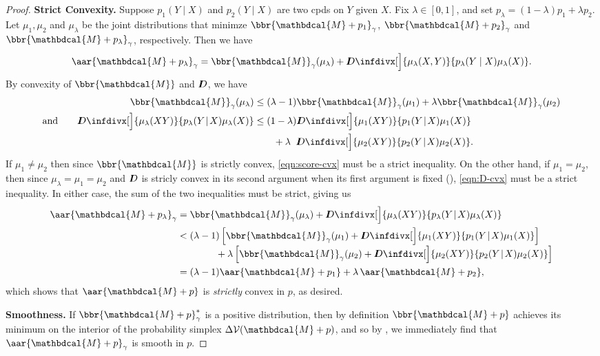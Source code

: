 \documentclass{article}
\theoremstyle{plain}
\newcounter{proofcntr}
\newenvironment{lproof}{\begin{proof}\refstepcounter{proofcntr}}{\end{proof}}
\theoremstyle{definition}
\theoremstyle{remark}
\newcommand{\thickD}{I\mkern-8muD}
\newcommand{\kldiv}{\thickD\infdivx}
\newcommand{\V}{\mathcal V}
\newcommand{\dg}[1]{\mathbdcal{#1}}
\newcommand\smid{\!\mid\!}
\newcommand{\bundle}{\mathbin{+}}
\begin{document}
\begin{lproof}
	\textbf{Strict Convexity.}
	Suppose $p_1(Y \mid X)$ and $p_2(Y\mid X)$ are two cpds on $Y$ given $X$.
	Fix $\lambda \in [0,1]$, and set $p_\lambda = (1-\lambda) p_1 + \lambda p_2$.
	Let $\mu_1, \mu_2$ and $\mu_\lambda$ be the joint distributions that minimze $\bbr{\dg M \bundle p_1}_\gamma$, $\bbr{\dg M \bundle p_2}_\gamma$ and $\bbr{\dg M \bundle p_\lambda}_\gamma$, respectively.  Then we have
	\begin{equation*}
		\aar{\dg M \bundle p_\lambda}_\gamma
			= \bbr{\dg M}_\gamma(\mu_\lambda) + \kldiv[\Big]{\mu_\lambda(X,Y)}{p_\lambda(Y\mid X) \mu_\lambda( X)}.
	\end{equation*}
	By convexity of $\bbr{\dg M}$ and $\thickD$, we have
	\begin{align}
		\bbr{\dg M}_\gamma(\mu_\lambda)
		 	&\le (\lambda-1)\bbr{\dg M}_\gamma(\mu_1) + \lambda \bbr{\dg M}_\gamma(\mu_2)
			 	\label{eqn:score-cvx}\\
		\text{and}\qquad \kldiv[\Big]{\mu_\lambda(XY)}{p_\lambda(Y\smid X) \mu_\lambda( X)}
			&\le (1-\lambda)\kldiv[\Big]{\mu_1(XY)}{p_1(Y \smid X) \mu_1( X)} \nonumber \\
			&\qquad+ \lambda\;\;\kldiv[\Big]{\mu_2(XY)}{p_2(Y\smid X) \mu_2( X)}.
				\label{eqn:D-cvx}
	\end{align}
	If $\mu_1 \ne \mu_2$ then since $\bbr{\dg M}$ is strictly convex, \eqref{eqn:score-cvx} must
	be a strict inequality. On the other hand, if $\mu_1 = \mu_2$, then since $\mu_\lambda = \mu_1 = \mu_2$ and $\thickD$ is stricly convex in its second argument when its first argument is fixed (), \eqref{eqn:D-cvx} must be a strict inequality.
	In either case, the sum of the two inequalities must be strict, giving us
	\begin{align*}
		\aar{\dg M \bundle p_\lambda}_\gamma &=
		\bbr{\dg M}_\gamma(\mu_\lambda) + \kldiv[\Big]{\mu_\lambda(XY)}{p_\lambda(Y\smid X) \mu_\lambda( X)} \\
		&<
		 (\lambda-1) \left[\bbr{\dg M}_\gamma(\mu_1)
			 	+ \kldiv[\Big]{\mu_1(XY)}{p_1(Y \smid X) \mu_1( X)} \right]
			 \\[-0.3em]&\qquad\qquad
			 + \lambda \left[ \bbr{\dg M}_\gamma(\mu_2)
			 	+ \kldiv[\Big]{\mu_2(XY)}{p_2(Y\smid X) \mu_2( X)}
			 	\right] \\
		 &= (\lambda-1) \aar{\dg M \bundle p_1} + \lambda\,\aar{\dg M \bundle p_2},
	\end{align*}
	which shows that $\aar{\dg M \bundle p}$ is \emph{strictly} convex in $p$, as desired.


	\textbf{Smoothness.}
	If $\bbr{\dg M \bundle p}_\gamma^*$ is a positive distribution, then by definition $\bbr{\dg M \bundle p}$ achieves its minimum on the interior of the probability simplex $\Delta \V(\dg M \bundle p)$, and so by , we immediately find that $\aar{\dg M \bundle p}_\gamma$ is smooth in $p$.


\end{lproof}
\end{document}
